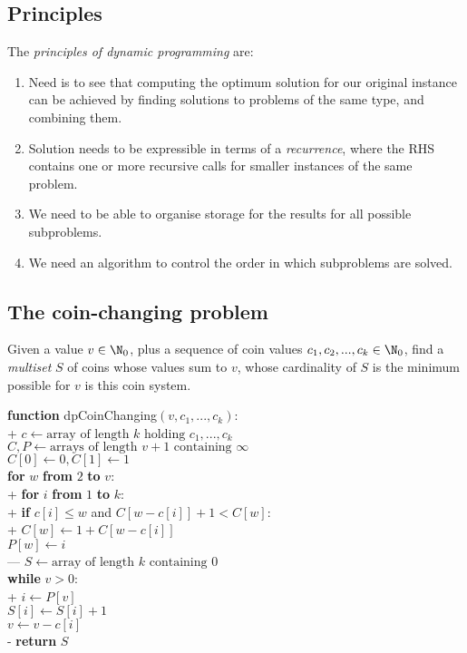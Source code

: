 \documentclass{article}
\begin{document}
\subsection{Principles}
\begin{definition}[L16]
	The \emph{principles of dynamic programming} are:
	\begin{enumerate}[label=(dp\arabic*)]
		\item Need is to see that computing the optimum solution for our original
		      instance can be achieved by finding solutions to problems of the same
		      type, and combining them.
		\item Solution needs to be expressible in terms of a \emph{recurrence},
		      where the RHS contains one or more recursive calls for smaller
		      instances of the same problem.
		\item We need to be able to organise storage for the results for all
		      possible subproblems.
		\item We need an algorithm to control the order in which subproblems
		      are solved.
	\end{enumerate}
\end{definition}

\subsection{The coin-changing problem}

\begin{definition}[L16]
	Given a value $v\in\N_0$, plus a sequence of coin values $c_1,c_2,...,c_k\in\N_0$,
	find a \emph{multiset} $S$ of coins whose values sum to $v$, whose cardinality
	of $S$ is the minimum possible for $v$ is this coin system.
\end{definition}

\begin{pseudo}
	\textbf{function} \textsf{dpCoinChanging}$(v, c_1, ..., c_k)$:					\\+
	$c\leftarrow\text{array of length $k$ holding $c_1, ..., c_k$}$				\\
	$C,P\leftarrow\text{arrays of length $v+1$ containing $\infty$}$			\\
	$C[0]\leftarrow 0,C[1]\leftarrow 1$											\\
	\textbf{for} $w$ \textbf{from} $2$ \textbf{to} $v$:							\\+
	\textbf{for} $i$ \textbf{from} $1$ \textbf{to} $k$:						\\+
	\textbf{if} $c[i]\leq w$ and $C[w-c[i]]+1<C[w]$:					\\+
	$C[w]\leftarrow 1 + C[w-c[i]]$									\\
	$P[w]\leftarrow i$												\\---
	$S\leftarrow\text{array of length $k$ containing $0$}$						\\
	\textbf{while} $v>0$:														\\+
	$i\leftarrow P[v]$														\\
	$S[i]\leftarrow S[i]+1$													\\
	$v\leftarrow v - c[i]$													\\-
	\textbf{return} $S$
\end{pseudo}
\end{document}
